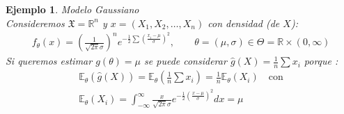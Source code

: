 \documentclass[10pt]{article}
\theoremstyle{plain}
\newtheorem{ej}{Ejemplo}
\theoremstyle{definition}
\begin{document}
\begin{ej} Modelo Gaussiano \\
Consideremos $\mathfrak{X} = \mathbb{R}^n$ y $x = (X_{1}, X_{2}, \ldots, X_{n})$ con densidad (de $X$):
\begin{align*}
f_{\theta}(x) = \left(\frac{1}{\sqrt{2\pi}\sigma}\right)^ne^{-\frac{1}{2}\sum{\left(\frac{x_{i}-\mu}{\sigma}\right)^2}},\ &\quad \theta = (\mu, \sigma) \in \Theta = \mathbb{R}\times (0,\infty)
\end{align*}
Si queremos estimar $g(\theta) = \mu$ se puede considerar $\hat{g}(X) = \frac{1}{n}\sum{x_{i}}$ porque :
\begin{align*} %
\mathbb{E}_{\theta}(\hat{g}(X)) = \mathbb{E}_{\theta}\left(\frac{1}{n}\sum x_{i}\right) = \frac{1}{n}\mathbb{E}_{\theta}(X_{i})\quad \text{con}\\
\mathbb{E}_{\theta}(X_{i})= \int_{-\infty}^{\infty}{\frac{x}{\sqrt{2\pi}\sigma}e^{-\frac{1}{2}\left(\frac{x-\mu}{\sigma}\right)^2}dx} = \mu
\end{align*}
\end{ej}
\end{document}
